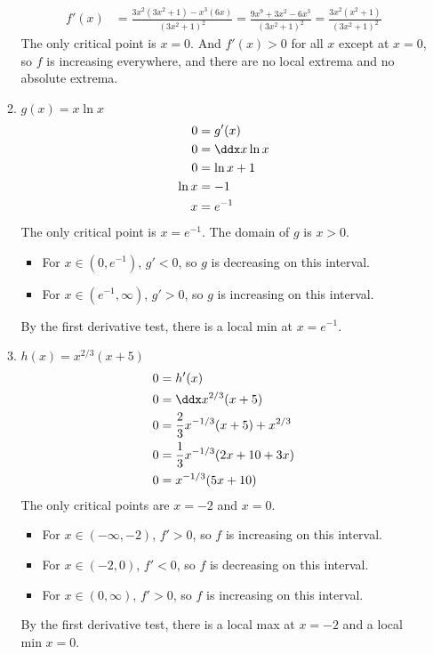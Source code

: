 \begin{enumerate}
\begin{enumerate}
    \begin{align*}
    	f'(x) 
        &= \frac{3x^2(3x^2+1)-x^3(6x)}{(3x^2+1)^2} 
        = \frac{9x^9 + 3x^2 - 6x^3}{(3x^2+1)^2}
        = \frac{3x^2(x^2+1)}{(3x^2+1)^2}
    \end{align*}
    The only critical point is $x=0$. And $f'(x) > 0$ for all $x$ except at $x=0$, so $f$ is increasing everywhere, and there are no local extrema and no absolute extrema. 
    
    \item $\displaystyle g(x)=x\ln x$
    \begin{align*}
    	0 &= g'(x) \\
        0 &= \ddx x \ln x \\
        0 &= \ln x + 1 \\
        \ln x &= -1 \\
        x &= e^{-1} 
    \end{align*}
    The only critical point is $x=e^{-1}$. The domain of $g$ is $x>0$.
    \begin{itemize}
    	\item For $x\in (0,e^{-1})$, $g' < 0$, so $g$ is decreasing on this interval.
    	\item For $x\in (e^{-1},\infty)$, $g' > 0$, so $g$ is increasing on this interval.   
    \end{itemize}
    By the first derivative test, there is a local min at $x = e^{-1}$.
    
    
    \item $\displaystyle h(x)=x^{2/3}(x+5)$
	\begin{align*}
    	0 &= h'(x) \\
        0 &= \ddx x^{2/3}(x+5) \\
        0 &= \frac 2 3 x^{-1/3}(x+5) + x^{2/3} \\
        0 &= \frac 1 3 x^{-1/3}(2x + 10 + 3x) \\
        0 &= x^{-1/3}(5x + 10)
    \end{align*}
    The only critical points are $x=-2$ and $x=0$. 
    \begin{itemize}
    	\item For $x\in (-\infty,-2)$, $f' > 0$, so $f$ is increasing on this interval.
    	\item For $x\in (-2,0)$, $f' < 0$, so $f$ is decreasing on this interval.
    	\item For $x\in (0,\infty)$, $f' > 0$, so $f$ is increasing on this interval.
    \end{itemize}
    By the first derivative test, there is a local max at $x=-2$ and a local min $x = 0$.    

\end{enumerate}
\end{enumerate}

















